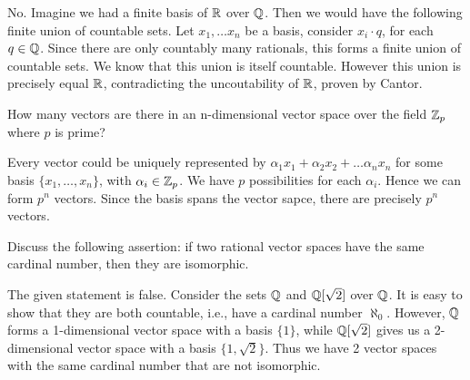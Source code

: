\begin{solution}
  No.
  Imagine we had a finite basis of $\mathbb{R}$ over $\mathbb{Q}$.
  Then we would have the following finite union of countable sets.
  Let $x_1, \ldots x_n$ be a basis, consider $x_i \cdot q$, for each $q \in \mathbb{Q}$.
  Since there are only countably many rationals, this forms a finite union of countable sets.
  We know that this union is itself countable.
  However this union is precisely equal $\mathbb{R}$, contradicting the uncoutability of $\mathbb{R}$, proven by Cantor.
\end{solution}

\begin{problem}
  How many vectors are there in an n-dimensional vector space over the field $\mathbb{Z}_p$ where $p$ is prime?
\end{problem}

\begin{solution}
  Every vector could be uniquely represented by $\alpha_1 x_1 + \alpha_2 x_2 + \ldots \alpha_n x_n$ for some basis $\{x_1, \ldots, x_n\}$, with $\alpha_i \in \mathbb{Z}_p$.
  We have $p$ possibilities for each $\alpha_i$.
  Hence we can form $p^n$ vectors.
  Since the basis spans the vector sapce, there are precisely $p^n$ vectors.
\end{solution}

\begin{problem}
  Discuss the following assertion: if two rational vector spaces have the same cardinal number, then they are isomorphic.
\end{problem}

\begin{solution}
  The given statement is false.
  Consider the sets $\mathbb{Q}$ and $\mathbb{Q}[\sqrt{2}]$ over $\mathbb{Q}$.
  It is easy to show that they are both countable, i.e., have a cardinal number $\aleph_0$.
  However, $\mathbb{Q}$ forms a 1-dimensional vector space with a basis $\{1\}$, while $\mathbb{Q}[\sqrt{2}]$ gives us a 2-dimensional vector space with a basis $\{1, \sqrt{2}\}$.
  Thus we have 2 vector spaces with the same cardinal number that are not isomorphic.
\end{solution}
